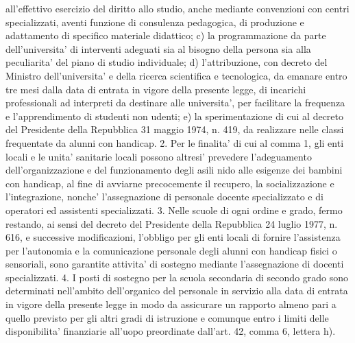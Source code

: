     all'effettivo esercizio del diritto allo studio, anche mediante convenzioni con centri specializzati, aventi funzione di consulenza pedagogica, di produzione e adattamento di specifico materiale didattico; c) la programmazione da parte dell'universita' di interventi adeguati sia al bisogno della persona sia alla peculiarita' del piano di studio individuale; d) l'attribuzione, con decreto del Ministro
    dell'universita' e della ricerca scientifica e tecnologica, da emanare entro tre mesi dalla data di entrata in vigore della presente legge, di incarichi professionali ad interpreti da destinare alle universita', per facilitare la frequenza e l'apprendimento di studenti non udenti; e) la sperimentazione di cui al decreto del Presidente della Repubblica 31 maggio 1974, n. 419, da realizzare nelle classi frequentate da alunni con handicap. 2. Per le finalita' di cui al comma 1, gli enti locali e le unita' sanitarie locali possono altresi' prevedere l'adeguamento dell'organizzazione e del funzionamento degli asili nido alle esigenze dei bambini con handicap, al fine di avviarne precocemente il recupero, la socializzazione e l'integrazione, nonche' l'assegnazione di personale docente specializzato e di operatori ed assistenti specializzati. 3. Nelle scuole di ogni ordine e grado, fermo restando, ai sensi del decreto del Presidente della Repubblica
    24 luglio 1977, n. 616, e successive modificazioni, l'obbligo per gli enti locali di fornire l'assistenza per l'autonomia e la comunicazione personale degli alunni con handicap fisici o sensoriali, sono garantite attivita' di sostegno mediante l'assegnazione di docenti specializzati. 4. I posti di sostegno per la scuola secondaria di secondo grado sono determinati nell'ambito dell'organico del personale in servizio alla data di entrata in vigore della presente legge in modo da assicurare un rapporto almeno pari a quello previsto per gli altri gradi di istruzione e comunque entro i limiti delle disponibilita' finanziarie all'uopo preordinate dall'art. 42, comma 6,
    lettera h).
